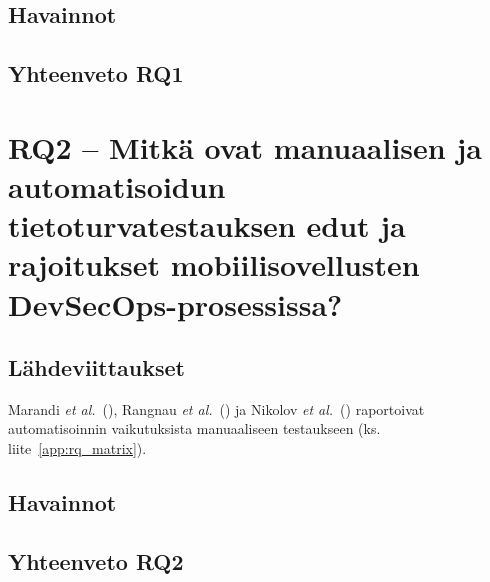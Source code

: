 \documentclass[bscthesis,finnish,oneside,biblatex]{uefcsthesis}
\begin{document}
\begin{description}
    \item[\cite{tony2019_practical}]
\end{description}

\begin{description}
    \item[\cite{rohin2018_book}]
\end{description}

\begin{description}
    \item[\cite{chung2024_devsecops}]
\end{description}

\subsection{Havainnot}

\subsection{Yhteenveto RQ1}

\section{RQ2 – Mitkä ovat manuaalisen ja automatisoidun tietoturvatestauksen edut ja rajoitukset mobiilisovellusten DevSecOps-prosessissa?}
\label{sec:rq2}

\subsection{Lähdeviittaukset}
Marandi \emph{et al.}\ (\citeyear{marandi2023_ias}),
Rangnau \emph{et al.}\ (\citeyear{putra2022_devsecops}) ja
Nikolov \emph{et al.}\ (\citeyear{rangnau2020_cst}) raportoivat automatisoinnin
vaikutuksista manuaaliseen testaukseen (ks. liite~\ref{app:rq_matrix}).

\subsection{Havainnot}

\subsection{Yhteenveto RQ2}
\end{document}

